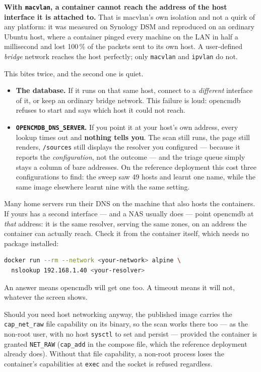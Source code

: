 \documentclass[11pt,oneside,listof=totoc,bibliography=totoc]{scrreprt}
\begin{document}
\begin{warning}
\textbf{With \texttt{macvlan}, a container cannot reach the address of the host interface it is
attached to.} That is macvlan's own isolation and not a quirk of any platform: it was measured on
Synology DSM and reproduced on an ordinary Ubuntu host, where a container pinged every machine on
the LAN in half a millisecond and lost 100\,\% of the packets sent to its own host. A user-defined
\emph{bridge} network reaches the host perfectly; only \texttt{macvlan} and \texttt{ipvlan} do
not.

This bites twice, and the second one is quiet.

\begin{itemize}
  \item \textbf{The database.} If it runs on that same host, connect to a \emph{different}
    interface of it, or keep an ordinary bridge network. This failure is loud: opencmdb refuses to
    start and says which host it could not reach.
  \item \textbf{\texttt{OPENCMDB\_DNS\_SERVER}.} If you point it at your host's own address,
    every lookup times out and \textbf{nothing tells you}. The scan still runs, the page still
    renders, \texttt{/sources} still displays the resolver you configured --- because it reports
    the \emph{configuration}, not the outcome --- and the triage queue simply stays a column of
    bare addresses. On the reference deployment this cost three configurations to find: the sweep
    saw 49 hosts and learnt one name, while the same image elsewhere learnt nine with the same
    setting.
\end{itemize}

Many home servers run their DNS on the machine that also hosts the containers. If yours has a
second interface --- and a NAS usually does --- point opencmdb at \emph{that} address: it is the
same resolver, serving the same zones, on an address the container can actually reach. Check it
from the container itself, which needs no package installed:

\begin{lstlisting}[language=bash]
docker run --rm --network <your-network> alpine \
  nslookup 192.168.1.40 <your-resolver>
\end{lstlisting}

An answer means opencmdb will get one too. A timeout means it will not, whatever the screen shows.
\end{warning}

\begin{note}
Should you need host networking anyway, the published image carries the
\texttt{cap\_net\_raw} file capability on its binary, so the scan works there too --- as the
non-root user, with no host \texttt{sysctl} to set and persist --- provided the container is
granted \texttt{NET\_RAW} (\texttt{cap\_add} in the compose file, which the reference deployment
already does). Without that file capability, a non-root process loses the container's
capabilities at \texttt{exec} and the socket is refused regardless.
\end{note}
\end{document}
